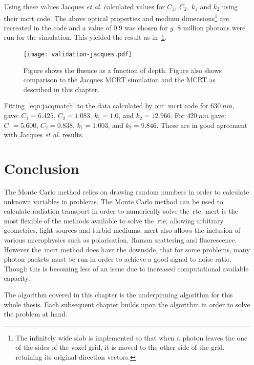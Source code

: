 Using these values Jacques \textit{et al.} calculated values for $C_1,\ C_2,\ k_1$ and $k_2$ using their \gls*{mcrt} code.
The above optical properties and medium dimensions\footnote{The infinitely wide slab is implemented so that when a photon leaves the one of the sides of the voxel grid, it is moved to the other side of the grid, retaining its original direction vectors.} are recreated in the code and a value of 0.9 was chosen for $g$.
8 million photons were run for the simulation.
This yielded the result as in~\cref{fig:matchjacq}.

\begin{figure}[!ht]
	\centering
	\texttt{[image: validation-jacques.pdf]}
	\caption{Figure shows the fluence as a function of depth. Figure also shows comparison to the Jacques MCRT simulation and the MCRT as described in this chapter.}
	\label{fig:matchjacq}
\end{figure}


Fitting~\cref{eqn:jacqmatch} to the data calculated by our~\gls*{mcrt} code for $630~nm$, gave: $C_1 = 6.425$, $C_2=1.083$, $k_1=1.0$, and $k_2=12.966$.
For $420~nm$ gave: $C_1 = 5.600$, $C_2=0.838$, $k_1=1.003$, and $k_2=9.846$.
These are in good agreement with Jacques \textit{et al.} results.

\section{Conclusion}

The Monte Carlo method relies on drawing random numbers in order to calculate unknown variables in problems.
The Monte Carlo method can be used to calculate radiation transport in order to numerically solve the~\gls*{rte}.
\Gls*{mcrt} is the most flexible of the methods available to solve the~\gls*{rte}, allowing arbitrary geometries, light sources and turbid mediums.
\Gls*{mcrt} also allows the inclusion of various microphysics such as polarisation, Raman scattering and fluorescence.
However the~\gls*{mcrt} method does have the downside, that for some problems, many photon packets must be run in order to achieve a good signal to noise ratio.
Though this is becoming less of an issue due to increased computational available capacity.

The algorithm covered in this chapter is the underpinning algorithm for this whole thesis.
Each subsequent chapter builds upon the algorithm in order to solve the problem at hand.

